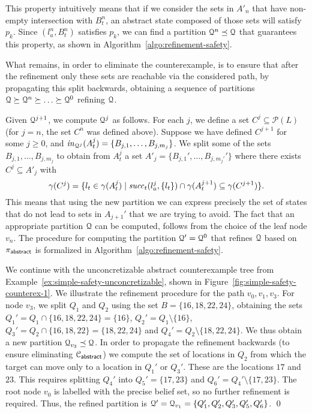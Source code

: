 This property intuitively means that if we consider the sets in $A'_n$ that have non-empty intersection with $B_t^n$, an abstract state composed of those sets will satisfy $p_k$. Since $(l_a^n,B_t^n)$ satisfies $p_k$, we can find a partition $\mathcal{Q}^n \preceq \mathcal{Q}$ that guarantees this property, as shown in Algorithm~\ref{algo:refinement-safety}.
 
What remains, in order to eliminate the counterexample, is to ensure that after the refinement only these sets are reachable via the considered path, by propagating this split backwards, obtaining a sequence of partitions $\mathcal{Q} \succeq \mathcal{Q}^n \succeq \ldots \succeq \mathcal{Q}^0$ refining $\mathcal{Q}$. 

Given $\mathcal{Q}^{j+1}$, we compute $\mathcal{Q}^j$ as follows. For each $j$, we define a set $C^j \subseteq \mathcal{P}(L)$ (for $j=n$, the set $C^n$ was defined above). Suppose we have defined $C^{j+1}$ for some $j \geq 0$, and $\mathit{in}_{\mathcal{Q}^j}(A_t^j) = \{B_{j,1},\ldots,B_{j,m_j}\}$. We split some of the sets $B_{j,1},\ldots,B_{j,m_j}$ to obtain from $A_t^j$ a set $A'_j = \{B_{j,1}',\ldots,B_{j,m_j'}'\}$ where there exists $C^j \subseteq A'_j$ with
\[\gamma(C^j) = \{l_t \in \gamma(A_t^j) \mid \mathit{succ}_t(l_a^j,\{l_t\}) \cap \gamma(A_t^{j+1}) \subseteq \gamma(C^{j+1})\}.\]
This means that using the new partition we can express precisely the set of states that do not lead to sets in $A_{j+1}'$ that we are trying to avoid. 
The fact that an appropriate partition $\mathcal{Q}$ can be computed, follows from the choice of the leaf node $v_n$. 
The procedure for computing the partition $\mathcal{Q}' = \mathcal{Q}^0$ that refines $\mathcal{Q}$ based on  $\pi_{\mathsf{abstract}}$ is formalized in Algorithm~\ref{algo:refinement-safety}.

\bigskip 

\begin{eg}
We continue with the unconcretizable abstract counterexample tree from Example~\ref{ex:simple-safety-unconcretizable}, shown in Figure~\ref{fig:simple-safety-counterex-1}. We illustrate the refinement procedure for the path $v_0,v_1,v_3$. For node $v_3$, we split $Q_1$ and $Q_2$ using the set $B = \{16,18,22,24\}$, obtaining the sets $Q_1' = Q_1 \cap \{16,18,22,24\} = \{16\}$, $Q_2' = Q_1\setminus\{16\}$, $Q_3' = Q_2 \cap \{16,18,22\} = \{18,22,24\}$ and $Q_4' = Q_2 \setminus \{18,22,24\}$. We thus obtain a new partition $\mathcal{Q}_{v_3} \preceq \mathcal{Q}$. In order to propagate the refinement backwards (to ensure eliminating $\mathcal{C}_{\mathsf{abstract}}$) we compute the set of locations in $Q_2$ from which the target can move only to a location in $Q_1'$ or $Q_3'$. These are the locations $17$ and $23$. This requires splitting $Q_4'$ into $Q_5' = \{17,23\}$ and $Q_6' = Q_4' \setminus \{17,23\}$. The root node $v_0$ is labelled with the precise belief set, so no further refinement is required. Thus, the refined partition is $\mathcal{Q}' = \mathcal{Q}_{v_1}= \{Q_1',Q_2',Q_3',Q_5',Q_6'\}$.  \qed
\end{eg}

